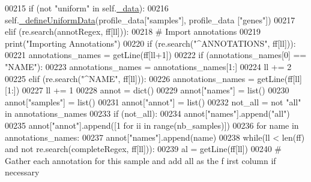 \begin{DoxyCode}
00215                 \textcolor{keywordflow}{if} (\textcolor{keywordflow}{not} \textcolor{stringliteral}{"uniform"} \textcolor{keywordflow}{in} self.\hyperlink{classnavicom_1_1navicom_1_1NaviCom_a407b2b5c30a5652ee85c4be54b3e6679}{_data}):
00216                     self.\hyperlink{classnavicom_1_1navicom_1_1NaviCom_a4d9f00c3c5de8b0f2e938d7019450ffe}{_defineUniformData}(profile\_data[\textcolor{stringliteral}{"samples"}], profile\_data
      [\textcolor{stringliteral}{"genes"}])
00217             \textcolor{keywordflow}{elif} (re.search(annotRegex, ff[ll])):
00218                 \textcolor{comment}{# Import annotations}
00219                 \textcolor{keywordflow}{print}(\textcolor{stringliteral}{"Importing Annotations"})
00220                 \textcolor{keywordflow}{if} (re.search(\textcolor{stringliteral}{"^ANNOTATIONS"}, ff[ll])):
00221                     annotations\_names = getLine(ff[ll+1])
00222                     \textcolor{keywordflow}{if} (annotations\_names[0] == \textcolor{stringliteral}{"NAME"}):
00223                         annotations\_names = annotations\_names[1:]
00224                     ll += 2
00225                 \textcolor{keywordflow}{elif} (re.search(\textcolor{stringliteral}{"^NAME"}, ff[ll])):
00226                     annotations\_names = getLine(ff[ll][1:])
00227                     ll += 1
00228                 annot = dict()
00229                 annot[\textcolor{stringliteral}{"names"}] = list()
00230                 annot[\textcolor{stringliteral}{"samples"}] = list()
00231                 annot[\textcolor{stringliteral}{"annot"}] = list()
00232                 not\_all = \textcolor{keywordflow}{not} \textcolor{stringliteral}{"all"} \textcolor{keywordflow}{in} annotations\_names
00233                 \textcolor{keywordflow}{if} (not\_all):
00234                     annot[\textcolor{stringliteral}{"names"}].append(\textcolor{stringliteral}{"all"})
00235                     annot[\textcolor{stringliteral}{"annot"}].append([1 \textcolor{keywordflow}{for} ii \textcolor{keywordflow}{in} range(nb\_samples)])
00236                 \textcolor{keywordflow}{for} name \textcolor{keywordflow}{in} annotations\_names:
00237                     annot[\textcolor{stringliteral}{"names"}].append(name)
00238                 \textcolor{keywordflow}{while}(ll < len(ff) \textcolor{keywordflow}{and} \textcolor{keywordflow}{not} re.search(completeRegex, ff[ll])):
00239                     al = getLine(ff[ll])
00240                     \textcolor{comment}{# Gather each annotation for this sample and add all as the f
      irst column if necessary}

\end{DoxyCode}
